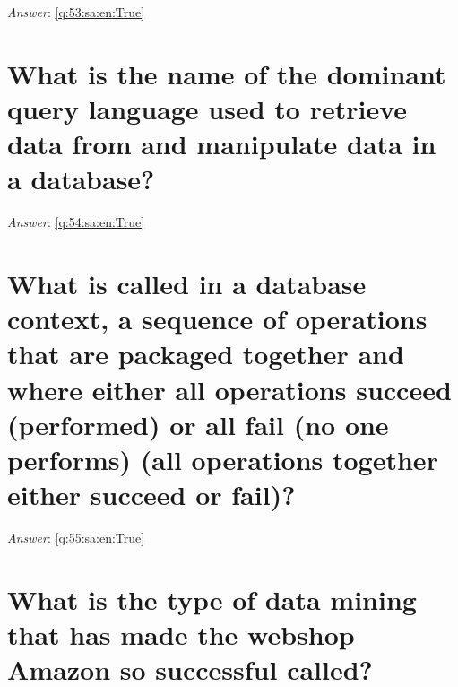 \documentclass[a4paper,11pt,oneside]{book}
\begin{document}
\begin{sloppypar}
\noindent\makebox[\textwidth]{\hrulefill}

\vspace{1cm}

\textit{Answer}: \autoref{q:53:sa:en:True}



\section{What is the name of the dominant query language used to retrieve data from and manipulate data in a database?}

\label{q:54:sa:en:False}

\vspace{2cm}

\noindent\makebox[\textwidth]{\hrulefill}

\vspace{1cm}

\textit{Answer}: \autoref{q:54:sa:en:True}



\section{What is called in a database context, a sequence of operations that are packaged together and where either all operations succeed (performed) or all fail (no one performs) (all operations together either succeed or fail)?}

\label{q:55:sa:en:False}

\vspace{2cm}

\noindent\makebox[\textwidth]{\hrulefill}

\vspace{1cm}

\textit{Answer}: \autoref{q:55:sa:en:True}



\section{What is the type of data mining that has made the webshop Amazon so successful called?}

\label{q:56:sa:en:False}

\vspace{2cm}

\noindent\makebox[\textwidth]{\hrulefill}

\vspace{1cm}


\end{sloppypar}
\end{document}

